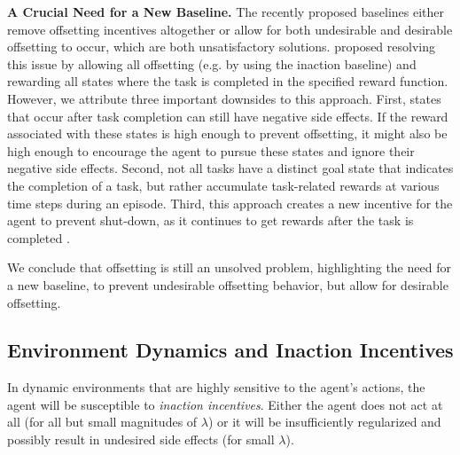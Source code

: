 \documentclass[letterpaper]{article} %
\begin{document}
\textbf{A Crucial Need for a New Baseline.} The recently proposed baselines either remove offsetting incentives altogether or allow for both undesirable and desirable offsetting to occur, which are both unsatisfactory solutions. \citet{krakovna2020avoiding} proposed resolving this issue by allowing all offsetting (e.g. by using the inaction baseline) and rewarding all states where the task is completed in the specified reward function. However, we attribute three important downsides to this approach. First, states that occur after task completion can still have negative side effects. If the reward associated with these states is high enough to prevent offsetting, it might also be high enough to encourage the agent to pursue these states and ignore their negative side effects. Second, not all tasks have a distinct goal state that indicates the completion of a task, but rather accumulate task-related rewards at various time steps during an episode. Third, this approach creates a new incentive for the agent to prevent shut-down, as it continues to get rewards after the task is completed \citep{hadfield2017off}.

We conclude that offsetting is still an unsolved problem, highlighting the need for a new baseline, to prevent undesirable offsetting behavior, but allow for desirable offsetting.


\subsection{Environment Dynamics and Inaction Incentives} \label{sec:environment_dynamics}
In dynamic environments that are highly sensitive to the agent's actions, the agent will be susceptible to \textit{inaction incentives}. Either the agent does not act at all (for all but small magnitudes of $\lambda$) or it will be insufficiently regularized and possibly result in undesired side effects (for small $\lambda$). 
\end{document}

